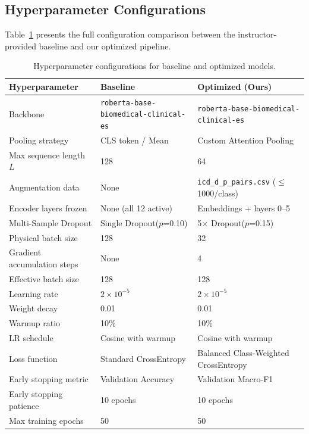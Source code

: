 \documentclass[10pt,a4paper,twocolumn]{article}
\begin{document}
\subsection{Hyperparameter Configurations}

Table~\ref{tab:hyperparameters} presents the full configuration comparison
between the instructor-provided baseline and our optimized pipeline.

\begin{table}[t]
\centering
\caption{Hyperparameter configurations for baseline and optimized models.}
\label{tab:hyperparameters}
\begin{tabular}{lp{6cm}p{6cm}}
\toprule
\textbf{Hyperparameter} & \textbf{Baseline} & \textbf{Optimized (Ours)} \\
\midrule
Backbone & \texttt{roberta-base-biomedical-clinical-es} & \texttt{roberta-base-biomedical-clinical-es} \\
Pooling strategy & CLS token / Mean & Custom Attention Pooling \\
Max sequence length $L$ & 128 & 64 \\
Augmentation data & None & \texttt{icd\_d\_p\_pairs.csv} ($\leq$1000/class) \\
Encoder layers frozen & None (all 12 active) & Embeddings + layers 0--5 \\
Multi-Sample Dropout & Single Dropout($p$=0.10) & 5$\times$ Dropout($p$=0.15) \\
Physical batch size & 128 & 32 \\
Gradient accumulation steps & None & 4 \\
Effective batch size & 128 & 128 \\
Learning rate & $2 \times 10^{-5}$ & $2 \times 10^{-5}$ \\
Weight decay & 0.01 & 0.01 \\
Warmup ratio & 10\% & 10\% \\
LR schedule & Cosine with warmup & Cosine with warmup \\
Loss function & Standard CrossEntropy & Balanced Class-Weighted CrossEntropy \\
Early stopping metric & Validation Accuracy & Validation Macro-F1 \\
Early stopping patience & 10 epochs & 10 epochs \\
Max training epochs & 50 & 50 \\
\bottomrule
\end{tabular}
\end{table}
\end{document}
